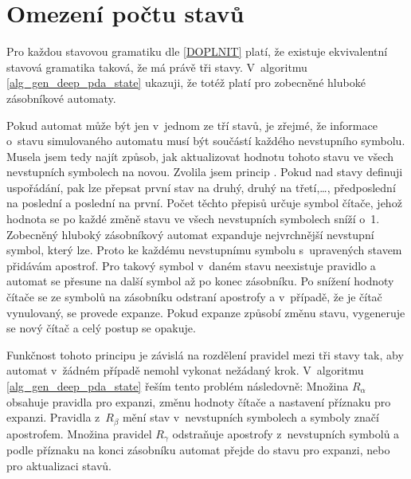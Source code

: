 \section{Omezení počtu stavů}


Pro každou stavovou gramatiku dle \ref{DOPLNIT} platí, že existuje ekvivalentní stavová gramatika taková, že má právě tři stavy. V~algoritmu \ref{alg_gen_deep_pda_state} ukazuji, že totéž platí pro zobecněné hluboké zásobníkové automaty.

Pokud automat může být jen v~jednom ze tří stavů, je zřejmé, že informace o~stavu simulovaného automatu musí být součástí každého nevstupního symbolu. Musela jsem tedy najít způsob, jak aktualizovat hodnotu tohoto stavu ve všech nevstupních symbolech na novou. Zvolila jsem princip . Pokud nad stavy definuji uspořádání, pak lze přepsat první stav na druhý, druhý na třetí,\dots, předposlední na poslední a poslední na první. Počet těchto přepisů určuje symbol čítače, jehož hodnota se po každé změně stavu ve všech nevstupních symbolech sníží o~1. Zobecněný hluboký zásobníkový automat expanduje nejvrchnější nevstupní symbol, který lze. Proto ke každému nevstupnímu symbolu s~upravených stavem přidávám apostrof. Pro takový symbol v~daném stavu neexistuje pravidlo a automat se přesune na další symbol až po konec zásobníku. Po snížení hodnoty čítače se ze symbolů na zásobníku odstraní apostrofy a v~případě, že je čítač vynulovaný, se provede expanze. Pokud expanze způsobí změnu stavu, vygeneruje se nový čítač a celý postup se opakuje.

Funkčnost tohoto principu je závislá na rozdělení pravidel mezi tři stavy tak, aby automat v~žádném případě nemohl vykonat nežádaný krok. V~algoritmu \ref{alg_gen_deep_pda_state} řeším tento problém následovně: Množina $R_{\alpha}$ obsahuje pravidla pro expanzi, změnu hodnoty čítače a nastavení příznaku pro expanzi. Pravidla z~$R_{\beta}$ mění stav v~nevstupních symbolech a symboly značí apostrofem. Množina pravidel $R_{\gamma}$ odstraňuje apostrofy z~nevstupních symbolů a podle příznaku na konci zásobníku automat přejde do stavu pro expanzi, nebo pro aktualizaci stavů.

